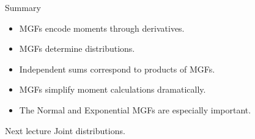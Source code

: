 \begin{frame}{Summary}
\begin{itemize}
    \item MGFs encode moments through derivatives.

    \item MGFs determine distributions.

    \item Independent sums correspond to products of MGFs.

    \item MGFs simplify moment calculations dramatically.

    \item The Normal and Exponential MGFs are especially important.
\end{itemize}

\vspace{0.25cm}

\begin{keybox}{Next lecture}
Joint distributions.
\end{keybox}
\end{frame}
